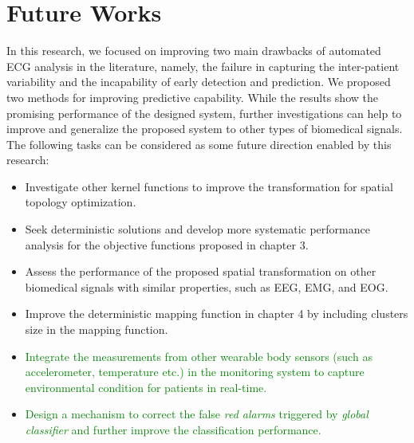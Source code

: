 \section{Future Works}
In this research, we focused on improving two main drawbacks of automated ECG analysis in the literature, namely, the failure in capturing the inter-patient variability and the incapability of early detection and prediction. We proposed two methods for improving predictive capability. While the results show the promising performance of the designed system, further investigations can help to improve and generalize the proposed system to other types of biomedical signals. The following tasks can be considered as some future direction enabled by this research:
 \begin{itemize}
\item Investigate other kernel functions to improve the transformation for spatial topology optimization.
\item Seek deterministic solutions and develop more systematic performance analysis for the objective functions proposed in chapter 3.
\item Assess the performance of the proposed spatial transformation on other biomedical signals with similar properties, such as EEG, EMG, and EOG.
\item  Improve the deterministic mapping function in chapter 4 by including clusters size in the mapping function.
\item \textcolor{green}{Integrate the measurements from other wearable body sensors (such as accelerometer, temperature etc.) in the monitoring system to capture environmental condition for patients in real-time.
}
\item \textcolor{green}{Design a mechanism to correct the false \textit{red alarms} triggered by \textit{global classifier} and further improve the classification performance.
}
\end{itemize}

